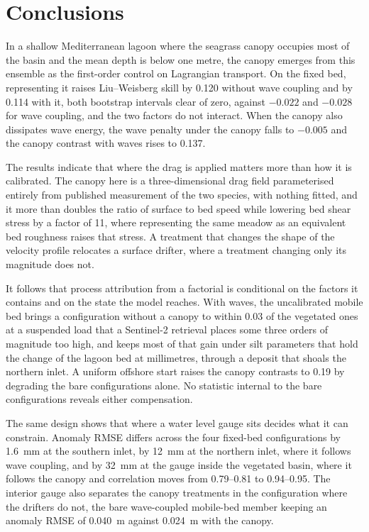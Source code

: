 \section{Conclusions}
\label{sec:conclusions}

In a shallow Mediterranean lagoon where the seagrass canopy occupies most of the
basin and the mean depth is below one metre, the canopy emerges from this
ensemble as the first-order control on Lagrangian transport. On the fixed bed,
representing it raises Liu--Weisberg skill by 0.120 without wave coupling and by
0.114 with it, both bootstrap intervals clear of zero, against $-0.022$ and
$-0.028$ for wave coupling, and the two factors do not interact. When the
canopy also dissipates wave energy, the wave penalty under the canopy falls to
$-0.005$ and the canopy contrast with waves rises to 0.137.

The results indicate that where the drag is applied matters more than how it is
calibrated. The canopy here is a three-dimensional drag field parameterised
entirely from published measurement of the two species, with nothing fitted, and
it more than doubles the ratio of surface to bed speed while lowering bed shear
stress by a factor of 11, where representing the same meadow as an equivalent
bed roughness raises that stress. A treatment that changes the shape of the
velocity profile relocates a surface drifter, where a treatment changing only
its magnitude does not.

It follows that process attribution from a factorial is conditional on the
factors it contains and on the state the model reaches. With waves, the
uncalibrated mobile bed brings a configuration without a canopy to within 0.03
of the vegetated ones at a suspended load that a Sentinel-2 retrieval places
some three orders of magnitude too high, and keeps most of that gain under silt
parameters that hold the change of the lagoon bed at millimetres, through a
deposit that shoals the northern inlet. A uniform offshore start
raises the canopy contrasts to 0.19 by degrading the bare configurations alone.
No statistic internal to the bare configurations reveals either compensation.

The same design shows that where a water level gauge sits decides what it can
constrain. Anomaly RMSE differs across the four fixed-bed configurations by
1.6~mm at the southern inlet, by 12~mm at the northern inlet, where it follows
wave coupling, and by 32~mm at the gauge inside the vegetated basin, where it
follows the canopy and correlation moves from 0.79--0.81 to 0.94--0.95. The
interior gauge also separates the canopy treatments in the configuration where
the drifters do not, the bare wave-coupled mobile-bed member keeping an anomaly
RMSE of 0.040~m against 0.024~m with the canopy.


